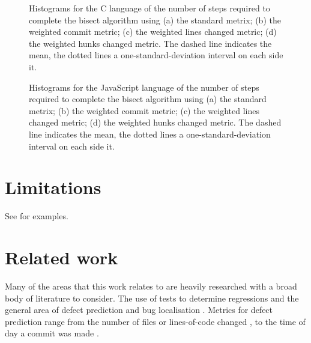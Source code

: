 \documentclass[10pt,journal,compsoc]{IEEEtran}
\begin{document}
\begin{figure*}[t]
\centering
{}
\hfil
{}
\hfil
{}
\hfil
{}
\caption{\label{fig:c-bisect}Histograms for the C language of the number of steps required to complete the bisect algorithm using (a) the standard metrix; (b) the weighted commit metric; (c) the weighted lines changed metric; (d) the weighted hunks changed metric. The dashed line indicates the mean, the dotted lines a one-standard-deviation interval on each side it.}
\end{figure*}

\begin{figure*}[t]
\centering
{}
\hfil
{}
\hfil
{}
\hfil
{}
\caption{\label{fig:javascript-bisect}Histograms for the JavaScript language of the number of steps required to complete the bisect algorithm using (a) the standard metrix; (b) the weighted commit metric; (c) the weighted lines changed metric; (d) the weighted hunks changed metric. The dashed line indicates the mean, the dotted lines a one-standard-deviation interval on each side it.}
\end{figure*}



\section{Limitations}

See \cite{moser2008} for examples.


\section{Related work}

Many of the areas that this work relates to are heavily researched with a broad body of literature to consider. The use of tests to determine regressions \cite{} and the general area of defect prediction and bug localisation \cite{kamei2013, shimagaki2016, yan2019}. Metrics for defect prediction range from the number of files or lines-of-code changed \cite{moser2008}, to the time of day a commit was made \cite{eyolfson2011}.
\end{document}
